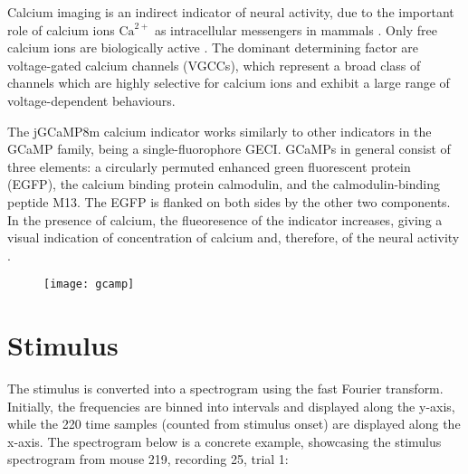 Calcium imaging is an indirect indicator of neural activity, due to the important role of calcium ions $\mathrm{Ca}^{2+}$ as intracellular messengers in mammals \parencite{grienbergerImagingCalciumNeurons2012}. Only free calcium ions are biologically active \parencite{grienbergerImagingCalciumNeurons2012}. The dominant determining factor are voltage-gated calcium channels (VGCCs), which represent a broad class of channels which are highly selective for calcium ions and exhibit a large range of voltage-dependent behaviours.

The jGCaMP8m calcium indicator works similarly to other indicators in the GCaMP family, being a single-fluorophore GECI. GCaMPs in general consist of three elements: a circularly permuted enhanced green fluorescent protein (EGFP), the calcium binding protein calmodulin, and the calmodulin-binding peptide M13. The EGFP is flanked on both sides by the other two components. In the presence of calcium, the flueoresence of the indicator increases, giving a visual indication of concentration of calcium and, therefore, of the neural activity \parencite{grienbergerImagingCalciumNeurons2012}.

\begin{figure}[ht]
	\centering
	\texttt{[image: gcamp]}
	\caption{\parencite{grienbergerImagingCalciumNeurons2012}}
\end{figure}



\section{Stimulus}

The stimulus is converted into a spectrogram using the fast Fourier transform. Initially, the frequencies are binned into intervals and displayed along the y-axis, while the 220 time samples (counted from stimulus onset) are displayed along the x-axis. The spectrogram below is a concrete example, showcasing the stimulus spectrogram from mouse 219, recording 25, trial 1:

